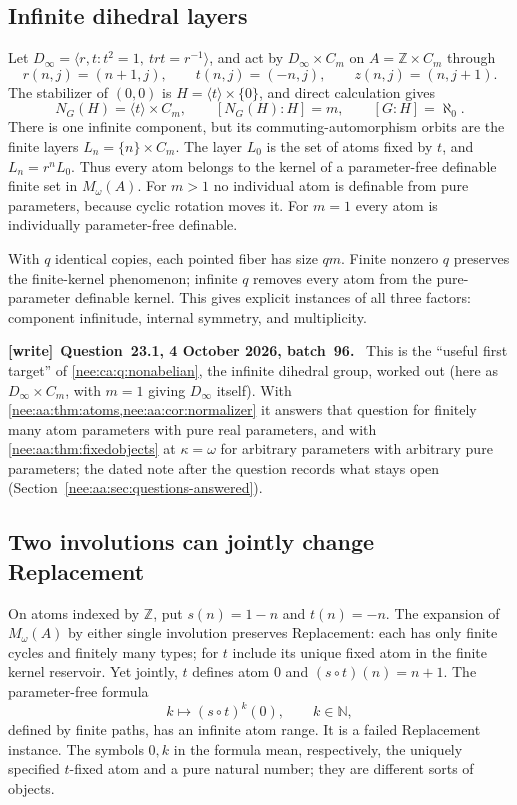 \documentclass[11pt,letterpaper]{article}
\numberwithin{equation}{section}
\theoremstyle{plain}
\theoremstyle{definition}
\theoremstyle{remark}
\newcommand{\NN}{\mathbb N}
\newcommand{\ZZ}{\mathbb Z}
\newenvironment{writenote}[1][]{\par\smallskip\begingroup\small\raggedright
 \setlength{\parindent}{1.25em}\noindent\textbf{[write]}\if\relax\detokenize{#1}\relax\else~\textbf{#1.}\fi\ }%
 {\par\endgroup\smallskip}
\begin{document}
\subsection{Infinite dihedral layers}\label{nee:aa:sec:dihedral}

Let $D_\infty=\langle r,t:t^2=1,\ trt=r^{-1}\rangle$, and act by
$D_\infty\times C_m$ on $A=\ZZ\times C_m$ through
\[
r(n,j)=(n+1,j),\qquad t(n,j)=(-n,j),\qquad z(n,j)=(n,j+1).
\]
The stabilizer of $(0,0)$ is $H=\langle t\rangle\times\{0\}$, and direct
calculation gives
\[
N_G(H)=\langle t\rangle\times C_m,\qquad
[N_G(H):H]=m,\qquad [G:H]=\aleph_0.
\]
There is one infinite component, but its commuting-automorphism orbits are the
finite layers $L_n=\{n\}\times C_m$. The layer $L_0$ is the set of atoms fixed
by $t$, and $L_n=r^nL_0$. Thus every atom belongs to the kernel of a
parameter-free definable finite set in $M_\omega(A)$. For $m>1$ no individual
atom is definable from pure parameters, because cyclic rotation moves it.
For $m=1$ every atom is individually parameter-free definable.

With $q$ identical copies, each pointed fiber has size $qm$. Finite nonzero
$q$ preserves the finite-kernel phenomenon; infinite $q$ removes every atom
from the pure-parameter definable kernel. This gives explicit instances of all
three factors: component infinitude, internal symmetry, and multiplicity.

\begin{writenote}[Question~23.1, 4 October 2026, batch~96]
This is the ``useful first target'' of \cref{nee:ca:q:nonabelian}, the infinite dihedral group, worked out (here as $D_\infty\times C_m$, with $m=1$ giving $D_\infty$ itself). With \cref{nee:aa:thm:atoms,nee:aa:cor:normalizer} it answers that question for finitely many atom parameters with pure real parameters, and with \cref{nee:aa:thm:fixedobjects} at $\kappa=\omega$ for arbitrary parameters with arbitrary pure parameters; the dated note after the question records what stays open (Section~\ref{nee:aa:sec:questions-answered}).
\end{writenote}

\subsection{Two involutions can jointly change Replacement}\label{nee:aa:sec:involutions}

On atoms indexed by $\ZZ$, put $s(n)=1-n$ and $t(n)=-n$. The expansion of
$M_\omega(A)$ by either single involution preserves Replacement: each has only
finite cycles and finitely many types; for $t$ include its unique fixed atom
in the finite kernel reservoir. Yet jointly, $t$ defines atom $0$ and
$(s\circ t)(n)=n+1$. The parameter-free formula
\[
k\longmapsto (s\circ t)^k(0),\qquad k\in\NN,
\]
defined by finite paths, has an infinite atom range. It is a failed
Replacement instance. The symbols $0,k$ in the formula mean, respectively,
the uniquely specified $t$-fixed atom and a pure natural number; they are
different sorts of objects.
\end{document}
